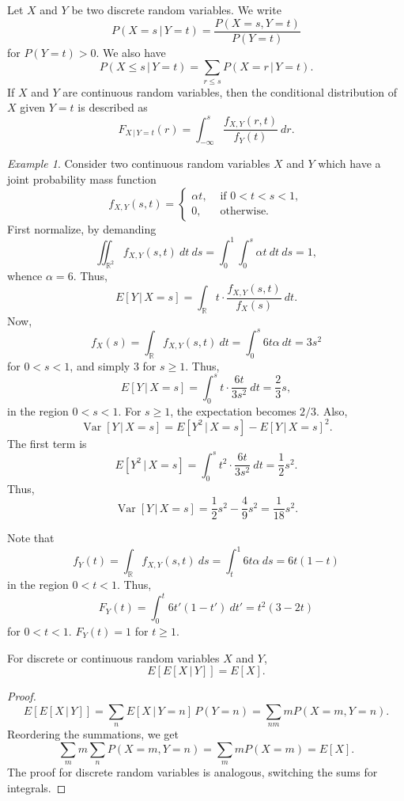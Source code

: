 \documentclass[11pt]{article}
\def\R{\mathbb{R}}
\newcommand\E[1]{E\left[#1\right]}
\newcommand\var[1]{\operatorname{Var}[#1]}
\theoremstyle{definition}
\theoremstyle{remark}
\newtheorem*{example}{Example}
\numberwithin{equation}{module}
\begin{document}
    \begin{definition}
        Let $X$ and $Y$ be two discrete random variables. We write \[
            P(X = s\,|\, Y = t) = \frac{P(X = s, Y = t)}{P(Y = t)}
        \] for $P(Y = t) > 0$. We also have \[
            P(X \leq s \,|\, Y = t) = \sum_{r \leq s}P(X = r\,|\, Y = t).
        \]
        If $X$ and $Y$ are continuous random variables, then the conditional
        distribution of $X$ given $Y = t$ is described as \[
            F_{X\,|\, Y = t}(r) = \int_{-\infty}^s \frac{f_{X, Y}(r, t)}{f_Y(t)}\:dr.
        \] 
    \end{definition}
    \begin{example}
        Consider two continuous random variables $X$ and $Y$ which have a joint
        probability mass function \[
            f_{X, Y}(s, t) = \begin{cases}
                \alpha t, &\text{ if }0 < t < s < 1, \\
                0, &\text{ otherwise.}
            \end{cases}
        \] First normalize, by demanding \[
            \iint_{\R^2} f_{X, Y}(s, t)\:dt\:ds = \int_0^1\int_0^s \alpha t\:dt\:ds = 1,
        \] whence $\alpha = 6$.
        Thus, \[
            \E{Y\,|\,X = s} = \int_\R t \cdot \frac{f_{X, Y}(s, t)}{f_X(s)}\:dt.
        \] Now, \[
            f_X(s) = \int_\R f_{X, Y}(s, t)\:dt = \int_0^s 6t\alpha\:dt = 3s^2
        \] for $0 < s < 1$, and simply $3$ for $s \geq 1$. Thus, \[
            \E{Y\,|\, X = s} = \int_0^s t\cdot \frac{6t}{3s^2}\:dt = \frac{2}{3}s,
        \] in the region $0 < s < 1$. For $s \geq 1$, the expectation becomes $2 /
        3$. 
        Also, \[
            \var{Y\,|\, X = s} = \E{Y^2 \,|\, X = s} - \E{Y \,|\,X = s}^2.
        \] The first term is \[
            \E{Y^2\,|\, X = s} = \int_0^s t^2\cdot \frac{6t}{3s^2}\:dt =
            \frac{1}{2}s^2.
        \] Thus, \[
            \var{Y\,|\, X = s} = \frac{1}{2}s^2 - \frac{4}{9}s^2 = \frac{1}{18}s^2.
        \]
        
        \noindent
        Note that \[
            f_Y(t) = \int_\R f_{X, Y}(s, t)\:ds = \int_t^1 6t\alpha\:ds = 6t(1 - t)
        \] in the region $0 < t < 1$. Thus, \[
            F_Y(t) = \int_0^t 6t'(1 - t')\:dt' = t^2(3 - 2t)
        \] for $0 < t < 1$. $F_Y(t) = 1$ for $t \geq 1$.
    \end{example}

    \begin{theorem}
        For discrete or continuous random variables $X$ and $Y$, \[
            \E{\E{X\,|\,Y}} = \E{X}.
        \] 
    \end{theorem}
    \begin{proof}
        \[
            \E{\E{X\,|\,Y}} = \sum_n \E{X\,|\,Y = n}\,P(Y = n) = \sum_{nm}
            m P(X = m, Y = n).
        \] Reordering the summations, we get \[
            \sum_{m}m\sum_{n}P(X = m, Y = n) = \sum_{m}mP(X = m) = \E{X}.
        \] The proof for discrete random variables is analogous, switching the sums
        for integrals.
    \end{proof}
\end{document}
